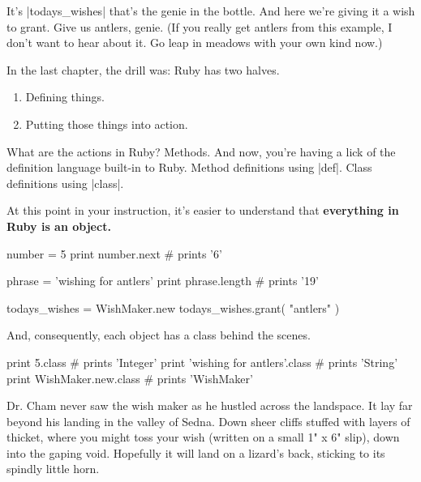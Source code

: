 \documentclass[12pt,twoside]{report}
\begin{document}
It's \rubyinline|todays_wishes| that's the genie in
the bottle.  And here we're giving it a wish to grant. Give us
antlers, genie.  (If you really get antlers from this example, I don't
want to hear about it.  Go leap in meadows with your own kind now.)

In the last chapter, the drill was: Ruby has two halves.

\begin{enumerate}
\item Defining things.
\item Putting those things into action.
\end{enumerate}

What are the actions in Ruby?  Methods.  And now, you're having a lick
of the definition language built-in to Ruby.  Method definitions using
\rubyinline|def|.  Class definitions using
\rubyinline|class|.

At this point in your instruction, it's easier to understand that {\bf
  everything in Ruby is an object.}


\begin{rubycode}

 number = 5
 print number.next                  # prints '6'

 phrase = 'wishing for antlers'
 print phrase.length                # prints '19'

 todays_wishes = WishMaker.new
 todays_wishes.grant( "antlers" )

\end{rubycode}


And, consequently, each object has a class behind the scenes.


\begin{rubycode}

 print 5.class                       # prints 'Integer'
 print 'wishing for antlers'.class   # prints 'String'
 print WishMaker.new.class           # prints 'WishMaker'

\end{rubycode}


Dr. Cham never saw the wish maker as he hustled across the
landspace. It lay far beyond his landing in the valley of Sedna.  Down
sheer cliffs stuffed with layers of thicket, where you might toss your
wish (written on a small 1" x 6" slip), down into the gaping void.
Hopefully it will land on a lizard's back, sticking to its spindly
little horn.
\end{document}
